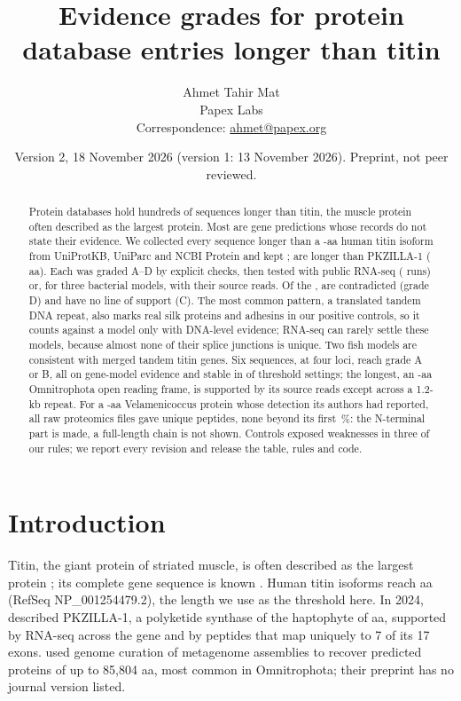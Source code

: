 \documentclass[11pt]{article}
\title{Evidence grades for protein database entries longer than titin}
\author{Ahmet Tahir Mat\\[2pt]\small Papex Labs\\[2pt]\small Correspondence: \href{mailto:ahmet@papex.org}{ahmet@papex.org}}
\date{\small Version 2, 18 November 2026 (version 1: 13 November 2026). Preprint, not peer reviewed.}
\begin{document}
\maketitle
\linenumbers

\begin{abstract}
\noindent Protein databases hold hundreds of sequences longer than titin, the muscle protein often described as the largest
protein. Most are gene predictions whose records do not state their evidence. We collected every sequence longer
than a -aa human titin isoform from UniProtKB, UniParc and NCBI Protein and kept ;
 are longer than PKZILLA-1 ( aa). Each was graded A--D by explicit checks, then tested
with public RNA-seq ( runs) or, for three bacterial models, with their source reads. Of the
,  are contradicted (grade D) and  have no line of support (C). The
most common pattern, a translated tandem DNA repeat, also marks real silk proteins and adhesins in our positive controls,
so it counts against a model only with DNA-level evidence; RNA-seq can rarely settle these models, because almost none of
their splice junctions is unique. Two fish models are consistent with merged tandem titin genes. Six sequences, at four
loci, reach grade A or B, all on gene-model evidence and stable in  of 
threshold settings; the longest, an -aa \Ca{} Omnitrophota open reading frame, is supported by its source
reads except across a 1.2-kb repeat. For a -aa \Ca{} Velamenicoccus protein whose detection its
authors had reported, all  raw proteomics files gave  unique peptides, none beyond
its first \,\%: the N-terminal part is made, a full-length chain is not shown. Controls
exposed weaknesses in three of our rules; we report every revision and release the table, rules and code.
\end{abstract}

\section{Introduction}

Titin, the giant protein of striated muscle, is often described as the largest protein \citep{labeit1995,westroberts2023};
its complete gene sequence is known \citep{bang2001}. Human titin isoforms reach  aa (RefSeq
NP\_001254479.2), the length we use as the threshold here. In 2024, \citet{fallon2024} described PKZILLA-1, a polyketide
synthase of the haptophyte  of  aa, supported by RNA-seq across the gene and by
peptides that map uniquely to 7 of its 17 exons. \citet{westroberts2023} used genome curation of metagenome assemblies to
recover predicted proteins of up to 85,804 aa, most common in \Ca{} Omnitrophota; their preprint has no journal version
listed.
\end{document}

